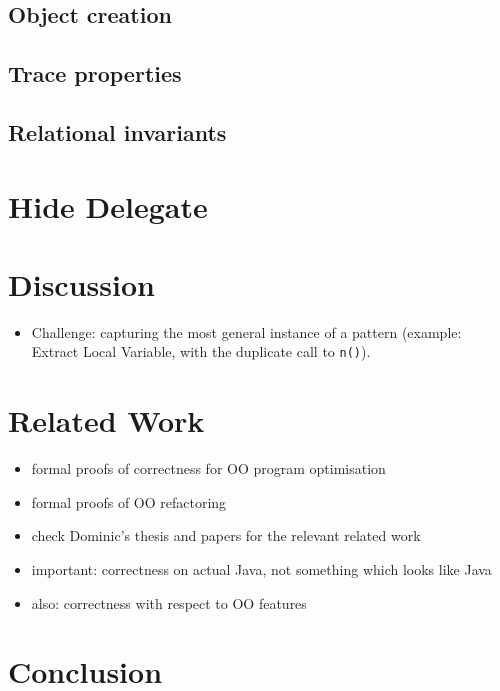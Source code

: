 \documentclass[runningheads]{llncs}
\begin{document}

\subsection{Object creation}\label{sec:objectcreation}


\subsection{Trace properties}


\subsection{Relational invariants}


\section{Hide Delegate}\label{sec:hide}

\section{Discussion}\label{sec:discussion}
\begin{itemize}
\item Challenge: capturing the most general instance of a pattern (example: Extract Local Variable, with the duplicate call to \texttt{n()}).
\end{itemize}

\section{Related Work}\label{sec:related}


\begin{itemize}
\item formal proofs of correctness for OO program optimisation
\item formal proofs of OO refactoring
\item check Dominic's thesis and papers for the relevant related work
\item important: correctness on actual Java, not something which looks like Java
\item also: correctness with respect to OO features
\end{itemize}

\section{Conclusion}\label{sec:conclusion}
\end{document}
